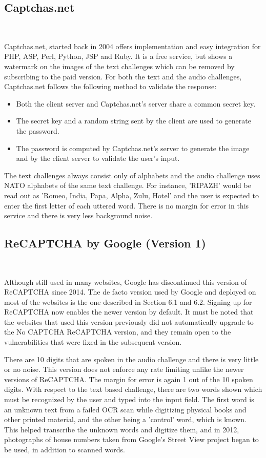 \subsection{Captchas.net} \mbox{} \

Captchas.net, started back in 2004 offers implementation and easy integration for PHP, ASP, Perl, Python, JSP and Ruby. It is a free service, but shows a watermark on the images of the text challenges which can be removed by subscribing to the paid version. For both the text and the audio challenges, Captchas.net follows the following method to validate the response:
\begin{itemize}
\item Both the client server and Captchas.net's server share a common secret key.
\item The secret key and a random string sent by the client are used to generate the password.
\item The password is computed by Captchas.net's server to generate the image and by the client server to validate the user's input.
\end{itemize}
The text challenges always consist only of alphabets and the audio challenge uses NATO alphabets of the same text challenge. For instance, 'RIPAZH' would be read out as 'Romeo, India, Papa, Alpha, Zulu, Hotel' and the user is expected to enter the first letter of each uttered word. There is no margin for error in this service and there is very less background noise.\newline


\subsection{ReCAPTCHA by Google (Version 1)} \mbox{} \

Although still used in many websites, Google has discontinued this version of ReCAPTCHA since 2014. The de facto version used by Google and deployed on most of the websites is the one described in Section 6.1 and 6.2. Signing up for ReCAPTCHA now enables the newer version by default. It must be noted that the websites that used this version previously did not automatically upgrade to the No CAPTCHA ReCAPTCHA version, and they remain open to the vulnerabilities that were fixed in the subsequent version. \newline

There are 10 digits that are spoken in the audio challenge and there is very little or no noise. This version does not enforce any rate limiting unlike the newer versions of ReCAPTCHA. The margin for error is again 1 out of the 10 spoken digits. With respect to the text based challenge, there are two words shown which must be recognized by the user and typed into the input field. The first word is an unknown text from a failed OCR scan while digitizing physical books and other printed material, and the other being a 'control' word, which is known. This helped transcribe the unknown words and digitize them, and in 2012, photographs of house numbers taken from Google's Street View project began to be used, in addition to scanned words. \newline


